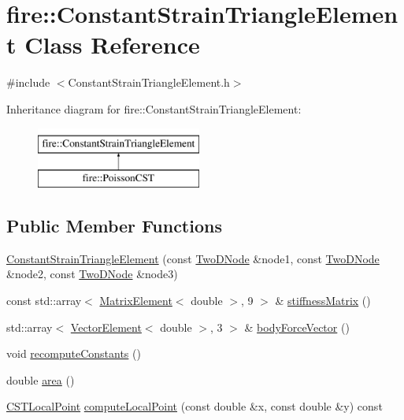 \hypertarget{a00764}{}\section{fire\+:\+:Constant\+Strain\+Triangle\+Element Class Reference}
\label{a00764}


{\ttfamily \#include $<$Constant\+Strain\+Triangle\+Element.\+h$>$}

Inheritance diagram for fire\+:\+:Constant\+Strain\+Triangle\+Element\+:\begin{figure}[H]
\begin{center}
\leavevmode
\includegraphics[height=2.000000cm]{a00764}
\end{center}
\end{figure}
\subsection*{Public Member Functions}
\begin{DoxyCompactItemize}
\item 
\hyperlink{a00764_aa54c09f1dd7cacaf1f4f0b1428859c00}{Constant\+Strain\+Triangle\+Element} (const \hyperlink{a00189_a92dafcc05a788e1065a5792b67f0f70e}{Two\+D\+Node} \&node1, const \hyperlink{a00189_a92dafcc05a788e1065a5792b67f0f70e}{Two\+D\+Node} \&node2, const \hyperlink{a00189_a92dafcc05a788e1065a5792b67f0f70e}{Two\+D\+Node} \&node3)
\item 
const std\+::array$<$ \hyperlink{a00189_a1a12603621e7a1efa59ac5cb79f9d509}{Matrix\+Element}$<$ double $>$, 9 $>$ \& \hyperlink{a00764_a6da0892a84128d73e1186aeb69a37723}{stiffness\+Matrix} ()
\item 
std\+::array$<$ \hyperlink{a00189_a08f01d4bb892cf7b2386d0f3a8643d72}{Vector\+Element}$<$ double $>$, 3 $>$ \& \hyperlink{a00764_ae0795172aa1ee5ffc68ec0e2c4aab9cc}{body\+Force\+Vector} ()
\item 
void \hyperlink{a00764_a40cf9432221b62db76e8b154e3e81e3d}{recompute\+Constants} ()
\item 
double \hyperlink{a00764_acd197716c6bffaa3c7b472661f0e5ca4}{area} ()
\item 
\hyperlink{a00189_a124b14f4255dab47a3f7235a02cc65ee}{C\+S\+T\+Local\+Point} \hyperlink{a00764_a772e106e996b0d757332ca59b9c7f159}{compute\+Local\+Point} (const double \&x, const double \&y) const
\end{DoxyCompactItemize}
